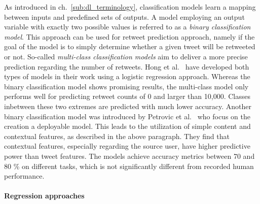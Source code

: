As introduced in ch.~\ref{sub:dl_terminology}, classification models learn a
mapping between inputs and predefined sets of outputs.
A model employing an output variable with exactly two possible values is referred
to as a \textit{binary classification model}.
This approach can be used for retweet prediction approach, namely if the goal
of the model is to simply determine whether a given tweet will be retweeted
or not.
So-called \textit{multi-class classification models} aim to deliver a more
precise prediction regarding the number of retweets.
Hong et al.~\cite{Hong2011} have developed both types of models in their work
using a logistic regression approach.
Whereas the binary classification model shows promising results, the multi-class
model only performs well for predicting retweet counts of 0 and larger than
10,000.
Classes inbetween these two extremes are predicted with much lower accuracy.
Another binary classification model was introduced by Petrovic et al.~\cite{Petrovic2011}
who focus on the creation a deployable model.
This leads to the utilization of simple content and contextual features, as described
in the above paragraph.
They find that contextual features, especially regarding the source user,
have higher predictive power than tweet features.
The models achieve accuracy metrics between 70 and 80 \% on different tasks,
which is not significantly different from recorded human performance.

\paragraph{Regression approaches}

